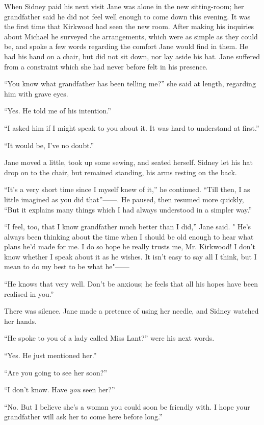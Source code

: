 When Sidney paid his next visit Jane was alone in the new sitting-room;
her grandfather said he did not feel well enough to come down this
evening. It was the first time that Kirkwood had seen the new room.
After making his inquiries about Michael he surveyed the arrangements,
which were as simple as they could be, and spoke a few words regarding
the comfort Jane would find in them. He had his hand on a chair, but did
not sit down, nor lay aside his hat. Jane suffered from a constraint
which she had never before felt in his presence.

``You know what grandfather has been telling me?'' she said at length,
regarding him with grave eyes.

``Yes. He told me of his intention.''

``I asked him if I might speak to you about it. It was hard to
understand at first.''

``It would be, I've no doubt.''

Jane moved a little, took up some sewing,
{\protect\hypertarget{260}{}{}}and seated herself. Sidney let his hat
drop on to the chair, but remained standing, his arms resting on the
back.

``It's a very short time since I myself knew of it,'' he continued.
``Till then, I as little imagined as you did {that''{{------}}.} He
paused, then resumed more quickly, ``But it explains many things which I
had always understood in a simpler way.''

``I feel, too, that I know grandfather much better than I did,'' Jane
said. " He's always been thinking about the time when I should be old
enough to hear what plans he'd made for me. I do so hope he really
trusts me, Mr. Kirkwood! I don't know whether I speak about it as he
wishes. It isn't easy to say all I think, but I mean to do my best to be
what {he"{{------}}}

``He knows that very well. Don't be anxious; he feels that all his hopes
have been realised in you.''

There was silence. Jane made a pretence of using her needle, and Sidney
watched her hands.

{\protect\hypertarget{261}{}{}}``He spoke to you of a lady called Miss
Lant?'' were his next words.

``Yes. He just mentioned her.''

``Are you going to see her soon?''

``I don't know. Have \emph{you} seen her?''

``No. But I believe she's a woman you could soon be friendly with. I
hope your grandfather will ask her to come here before long.''

